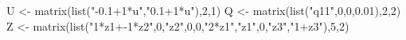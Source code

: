 \begin{Schunk}
\begin{Sinput}
 U <- matrix(list("-0.1+1*u","0.1+1*u"),2,1)
 Q <- matrix(list("q11",0,0,0.01),2,2)
 Z <- matrix(list("1*z1+-1*z2",0,"z2",0,0,"2*z1","z1",0,"z3","1+z3"),5,2)
\end{Sinput}
\end{Schunk}
